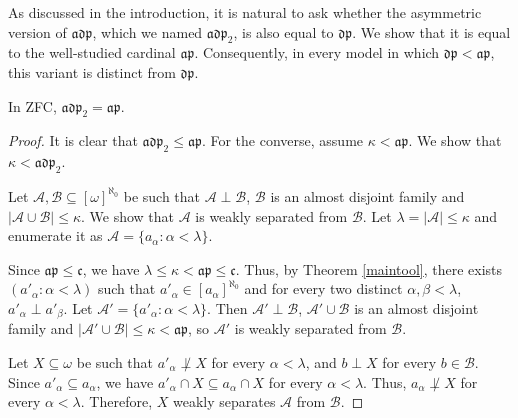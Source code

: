 As discussed in the introduction, it is natural to ask whether the asymmetric version of $\mathfrak{adp}$, which we named $\mathfrak{adp}_2$, is also equal to $\mathfrak{dp}$.
We show that it is equal to the well-studied cardinal $\mathfrak{ap}$.
Consequently, in every model in which $\mathfrak{dp}<\mathfrak{ap}$, this variant is distinct from $\mathfrak{dp}$.
\begin{thm}\label{thm:adp2}
    In ZFC, $\mathfrak{adp}_2=\mathfrak{ap}$.
\end{thm}
\begin{proof}
    It is clear that $\mathfrak{adp}_2\leq\mathfrak{ap}$. For the converse, assume $\kappa<\mathfrak{ap}$.
    We show that $\kappa<\mathfrak{adp}_2$.

    Let $\mathcal A, \mathcal B\subseteq[\omega]^{\aleph_0}$ be such that $\mathcal A\perp\mathcal B$, $\mathcal B$ is an almost disjoint family and $|\mathcal A\cup\mathcal B|\leq\kappa$.
    We show that $\mathcal A$ is weakly separated from $\mathcal B$.
    Let $\lambda=|\mathcal A|\leq \kappa$ and enumerate it as $\mathcal A=\{a_\alpha: \alpha<\lambda\}$.

    Since $\mathfrak{ap}\leq\mathfrak c$, we have
    $\lambda\leq\kappa<\mathfrak{ap}\leq\mathfrak c$.
    Thus, by Theorem \ref{maintool}, there exists $(a'_\alpha: \alpha<\lambda)$ such that $a'_\alpha\in[a_\alpha]^{\aleph_0}$ and for every two distinct
    $\alpha, \beta<\lambda$, $a'_\alpha\perp a'_\beta$. Let $\mathcal A'=\{a'_\alpha: \alpha<\lambda\}$. 
    Then $\mathcal A'\perp \mathcal B$, $\mathcal A'\cup\mathcal B$ is an almost disjoint family and
    $|\mathcal A'\cup\mathcal B|\leq \kappa<\mathfrak{ap}$, so $\mathcal A'$ is weakly separated from $\mathcal B$.

    Let $X\subseteq \omega$ be such that $a'_\alpha\not\perp X$ for every $\alpha<\lambda$, and $b\perp X$ for every $b\in\mathcal B$.
    Since $a'_\alpha\subseteq a_\alpha$, we have $a'_\alpha\cap X\subseteq a_\alpha\cap X$ for every $\alpha<\lambda$.
    Thus, $a_\alpha\not\perp X$ for every $\alpha<\lambda$.
    Therefore, $X$ weakly separates $\mathcal A$ from $\mathcal B$.
\end{proof}
